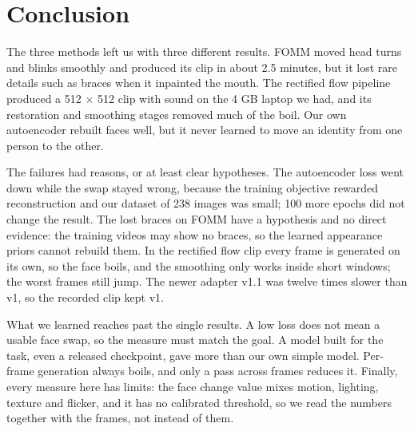 
\section{Conclusion}

The three methods left us with three different results. FOMM moved head turns
and blinks smoothly and produced its clip in about 2.5 minutes, but it lost rare
details such as braces when it inpainted the mouth. The rectified flow pipeline
produced a 512 $\times$ 512 clip with sound on the 4 GB laptop we had, and its
restoration and smoothing stages removed much of the boil. Our own autoencoder
rebuilt faces well, but it never learned to move an identity from one person to
the other.

The failures had reasons, or at least clear hypotheses. The autoencoder loss
went down while the swap stayed wrong, because the training objective rewarded
reconstruction and our dataset of 238 images was small; 100 more epochs did not
change the result. The lost braces on FOMM have a hypothesis and no direct
evidence: the training videos may show no braces, so the learned appearance
priors cannot rebuild them. In the rectified flow clip every frame is generated
on its own, so the face boils, and the smoothing only works inside short
windows; the worst frames still jump. The newer adapter v1.1 was twelve times
slower than v1, so the recorded clip kept v1.

What we learned reaches past the single results. A low loss does not mean a
usable face swap, so the measure must match the goal. A model built for the
task, even a released checkpoint, gave more than our own simple model. Per-frame
generation always boils, and only a pass across frames reduces it. Finally,
every measure here has limits: the face change value mixes motion, lighting,
texture and flicker, and it has no calibrated threshold, so we read the numbers
together with the frames, not instead of them.
